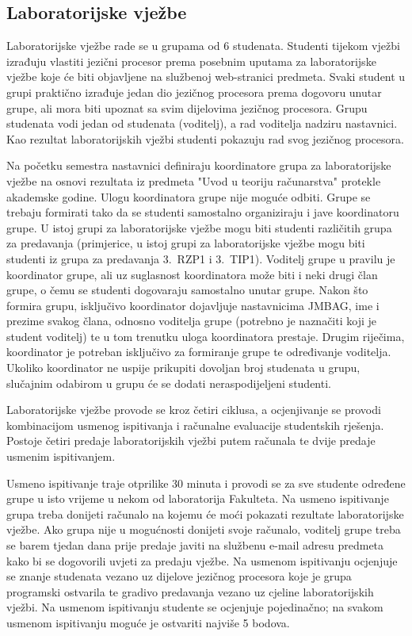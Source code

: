 \documentclass[times, 12pt, utf8]{book}
\begin{document}
\cleardoublepage  
{}  
{}
\subsection*{Laboratorijske vježbe}

Laboratorijske vježbe rade se u grupama od 6 studenata.
Studenti tijekom vježbi izrađuju vlastiti jezični procesor prema posebnim uputama za laboratorijske vježbe koje će biti objavljene na službenoj web-stranici predmeta.
Svaki student u grupi praktično izrađuje jedan dio jezičnog procesora prema dogovoru unutar grupe, ali mora biti upoznat sa svim dijelovima jezičnog procesora.
Grupu studenata vodi jedan od studenata (voditelj), a rad voditelja nadziru nastavnici.
Kao rezultat laboratorijskih vježbi studenti pokazuju rad svog jezičnog procesora.

Na početku semestra nastavnici definiraju koordinatore grupa za laboratorijske vježbe na osnovi rezultata iz predmeta "Uvod u teoriju računarstva" protekle akademske godine.
Ulogu koordinatora grupe nije moguće odbiti.
Grupe se trebaju formirati tako da se studenti samostalno organiziraju i jave koordinatoru grupe.
U istoj grupi za laboratorijske vježbe mogu biti studenti različitih grupa za predavanja (primjerice, u istoj grupi za laboratorijske vježbe mogu biti studenti iz grupa za predavanja 3.~RZP1 i 3.~TIP1).
Voditelj grupe u pravilu je koordinator grupe, ali uz suglasnost koordinatora može biti i neki drugi član grupe, o čemu se studenti dogovaraju samostalno unutar grupe.
Nakon što formira grupu, isključivo koordinator dojavljuje nastavnicima JMBAG, ime i prezime svakog člana, odnosno voditelja grupe (potrebno je naznačiti koji je student voditelj) te u tom trenutku uloga koordinatora prestaje.
Drugim riječima, koordinator je potreban isključivo za formiranje grupe te određivanje voditelja.
Ukoliko koordinator ne uspije prikupiti dovoljan broj studenata u grupu, slučajnim odabirom u grupu će se dodati neraspodijeljeni studenti. 

Laboratorijske vježbe provode se kroz četiri ciklusa, a ocjenjivanje se provodi kombinacijom usmenog ispitivanja i računalne evaluacije studentskih rješenja.
Postoje četiri predaje laboratorijskih vježbi putem računala te dvije predaje usmenim ispitivanjem.

Usmeno ispitivanje traje otprilike 30 minuta i provodi se za sve studente određene grupe u isto vrijeme u nekom od laboratorija Fakulteta.
Na usmeno ispitivanje grupa treba donijeti računalo na kojemu će moći pokazati rezultate laboratorijske vježbe.
Ako grupa nije u mogućnosti donijeti svoje računalo, voditelj grupe treba se barem tjedan dana prije predaje javiti na službenu e-mail adresu predmeta kako bi se dogovorili uvjeti za predaju vježbe.
Na usmenom ispitivanju ocjenjuje se znanje studenata vezano uz dijelove jezičnog procesora koje je grupa programski ostvarila te gradivo predavanja vezano uz cjeline laboratorijskih vježbi.
Na usmenom ispitivanju studente se ocjenjuje pojedinačno; na svakom usmenom ispitivanju moguće je ostvariti najviše 5 bodova.
\end{document}
